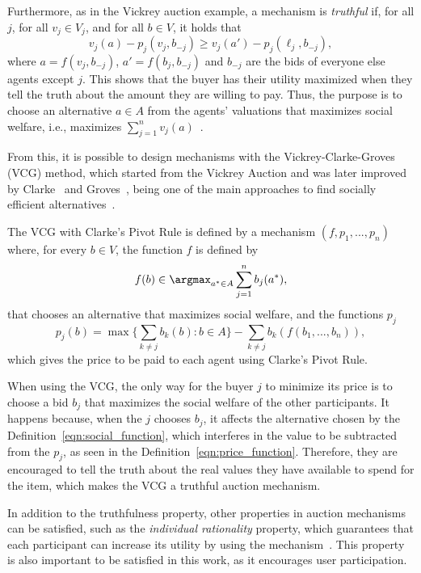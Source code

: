 \documentclass[English]{ic-tese-v3}
\begin{document}
Furthermore, as in the Vickrey auction example, a mechanism is \emph{truthful} if, for all $j$, for all $v_j \in V_j$, and for all $b \in V$, it holds that
\begin{equation} \label{eqn:incentive_compatible}
v_j(a) - p_j(v_j, b_{-j}) \ge v_j(a') - p_j(\ell_j, b_{-j}),
\end{equation}
where $a = f(v_j, b_{-j})$, $a' = f(b_j, b_{-j})$ and $b_{-j}$ are the bids of everyone else agents except $j$. This shows that the buyer has their utility maximized when they tell the truth about the amount they are willing to pay. Thus, the purpose is to choose an alternative $a \in A$ from the agents' valuations that maximizes social welfare, i.e., maximizes $\sum \limits_{j=1}^{n} v_j(a )$~\cite{TimAGT2007, RafaelAGT2015}.

From this, it is possible to design mechanisms with the Vickrey-Clarke-Groves (VCG) method, which started from the Vickrey Auction and was later improved by Clarke~\cite{Cla71} and Groves~\cite{Gro73}, being one of the main approaches to find socially efficient alternatives~\cite{RafaelAGT2015}.

The VCG with Clarke's Pivot Rule is defined by a mechanism $(f,p_1, ..., p_n)$ where, for every $b \in V$, the function $f$ is defined by
\begin{equation} \label{eqn:social_function}
    f(b) \in \argmax_{a^* \in A} \sum \limits_{j=1}^{n} b_j(a^*),
\end{equation}
that chooses an alternative that maximizes social welfare, and the functions $p_j$
\begin{equation} \label{eqn:price_function}
    p_j(b) = \max \bigg\{ \sum \limits_{k \neq j} b_k(b) : b \in A\bigg\} - \sum \limits_{k \neq j} b_k(f(b_1, ..., b_n)),
\end{equation}
which gives the price to be paid to each agent using Clarke's Pivot Rule.

When using the VCG, the only way for the buyer $j$ to minimize its price is to choose a bid $b_j$ that maximizes the social welfare of the other participants. It happens because, when the $j$ chooses $b_j$, it affects the alternative chosen by the Definition~\eqref{eqn:social_function}, which interferes in the value to be subtracted from the $p_j$, as seen in the Definition~\eqref{eqn:price_function}. Therefore, they are encouraged to tell the truth about the real values they have available to spend for the item, which makes the VCG a truthful auction mechanism.

In addition to the truthfulness property, other properties in auction mechanisms can be satisfied, such as the \emph{individual rationality} property, which guarantees that each participant can increase its utility by using the mechanism~\cite{SharghivandSurvey2021}. This property is also important to be satisfied in this work, as it encourages user participation.
\end{document}
